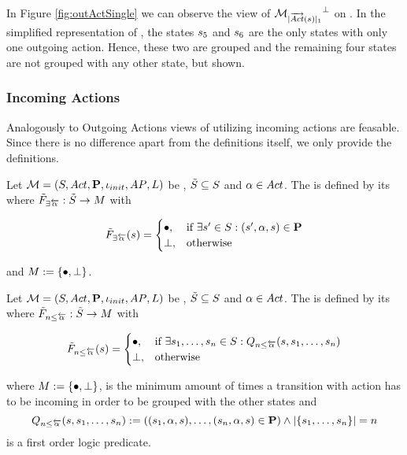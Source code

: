 \documentclass[preview]{standalone}
\begin{document}
In Figure \ref{fig:outActSingle} we can observe the view of ${{{{{\mathcal{M}}}}_{{|{\overrightarrow{{Act}}}({s})|_1}}}^{\bot}}$ on \chgph. In the simplified representation of \achgphN, the states ${s}_5$ and ${s}_6$ are the only states with only one outgoing action. Hence, these two are grouped and the remaining four states are not grouped with any other state, but shown.

\subsubsection{Incoming Actions}
Analogously to Outgoing Actions views of utilizing incoming actions are feasable. Since there is no difference apart from the definitions itself, we only provide the definitions.

\begin{definition}
	Let ${{{\mathcal{M}}}} = {{({S}, {Act}, {\textbf{P}}, {\iota_{init}}, {AP}, {L})}}$ be \achgphN, ${\tilde{{S}}} \subseteq {S}$ and ${\alpha} \in {Act}$. The \viewN \viewhasinaction is defined by its \grpfctN \gfcthasinaction where ${{\tilde{F}_{{\exists{\overleftarrow{\ensuremath{{\alpha}}}}}}}} : {\tilde{{S}}} \to {\ensuremath{{M}}}$ with

	\[
	{{\tilde{F}_{{\exists{\overleftarrow{\ensuremath{{\alpha}}}}}}}}({s}) =
	\begin{cases}
			{\bullet},				& \text{if } \exists {s}' \in {S}: ({s}', {\alpha}, {s}) \in {\ensuremath{{\textbf{P}}}} \\
			{\bot},          	& \text{otherwise}
		\end{cases}
	\]
	
	and ${{M}} := {\{{\bullet}, {\bot}\}}$.	
	\label{def:mininaction}
\end{definition}	


\begin{definition}
	Let ${{{\mathcal{M}}}} = {{({S}, {Act}, {\textbf{P}}, {\iota_{init}}, {AP}, {L})}}$ be \achgphN, ${\tilde{{S}}} \subseteq {S}$ and ${\alpha} \in {Act}$. The \viewN \viewmininaction is defined by its \grpfctN \gfctmininaction where ${{\tilde{F}_{{{n}\leq{\overleftarrow{\ensuremath{{\alpha}}}}}}}} : {\tilde{{S}}} \to {\ensuremath{{M}}}$ with

	\[
	{{\tilde{F}_{{{n}\leq{\overleftarrow{\ensuremath{{\alpha}}}}}}}}({s}) =
	\begin{cases}
			{\bullet},				& \text{if } \exists {s}_1, \dots, {s}_{n} \in {S}:  {Q_{{n}\leq{\overleftarrow{\ensuremath{{\alpha}}}}}({s},{s}_1, \dots, {s}_{{n}})}\\
			{\bot},          	& \text{otherwise}
		\end{cases}
	\]
	
	where ${{M}} := {\{{\bullet}, {\bot}\}}$,
	 is the minimum amount of times a transition with action \action has to be incoming in order to be grouped with the other states and
	\[
	{Q_{{n}\leq{\overleftarrow{\ensuremath{{\alpha}}}}}({s},{s}_1, \dots, {s}_{{n}})} := (({s}_1, {\alpha}, {s}), \dots, ({s}_{n}, {\alpha}, {s}) \in {\ensuremath{{\textbf{P}}}}) \land |\{{s}_1, \dots, {s}_{n}\}| = {n}
	\]
	is a first order logic predicate.
	\label{def:viewmaxinaction}
\end{definition}
\end{document}
